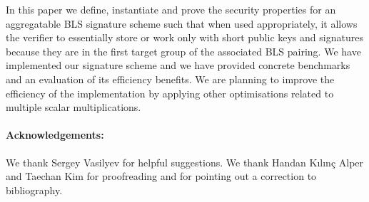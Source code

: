 \vspace{-0.01in}
\noindent In this paper we define, instantiate and prove the security properties for an aggregatable BLS signature 
scheme such that when used appropriately, it allows the verifier to essentially store or work only with short public keys 
and signatures because they are in the first target group of the associated BLS pairing. We have implemented
our signature scheme and we have provided concrete benchmarks and an evaluation of its efficiency benefits. We are planning to improve the efficiency of the implementation by applying other 
optimisations related to multiple scalar multiplications.

\paragraph{\textbf{Acknowledgements:}}  We thank Sergey Vasilyev for helpful suggestions. We thank Handan K{\i}l{\i}n\c c Alper and Taechan Kim for proofreading and for pointing out a correction to bibliography.   
